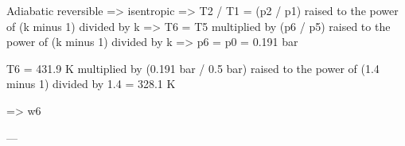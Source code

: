 Adiabatic reversible => isentropic  
=> T2 / T1 = (p2 / p1) raised to the power of (k minus 1) divided by k  
=> T6 = T5 multiplied by (p6 / p5) raised to the power of (k minus 1) divided by k  
=> p6 = p0 = 0.191 bar  

T6 = 431.9 K multiplied by (0.191 bar / 0.5 bar) raised to the power of (1.4 minus 1) divided by 1.4  
= 328.1 K  

=> w6  

---